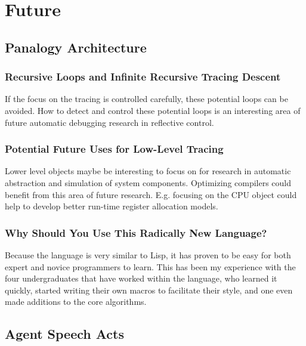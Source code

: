 \chapter{Future}\label{ch:future}

\section{Panalogy Architecture}



\subsection{Recursive Loops and Infinite Recursive Tracing Descent}

If the focus on the tracing is controlled carefully, these potential
loops can be avoided.  How to detect and control these potential loops
is an interesting area of future automatic debugging research in
reflective control.

\subsection{Potential Future Uses for Low-Level Tracing}

Lower level objects maybe be interesting to focus on for research in
automatic abstraction and simulation of system components.  Optimizing
compilers could benefit from this area of future research.  E.g.
focusing on the CPU object could help to develop better run-time
register allocation models.

\subsection{Why Should You Use This Radically New Language?}

Because the language is very similar to Lisp, it has proven to be easy
for both expert and novice programmers to learn.  This has been my
experience with the four undergraduates that have worked within the
language, who learned it quickly, started writing their own macros to
facilitate their style, and one even made additions to the core
algorithms.

\section{Agent Speech Acts}

